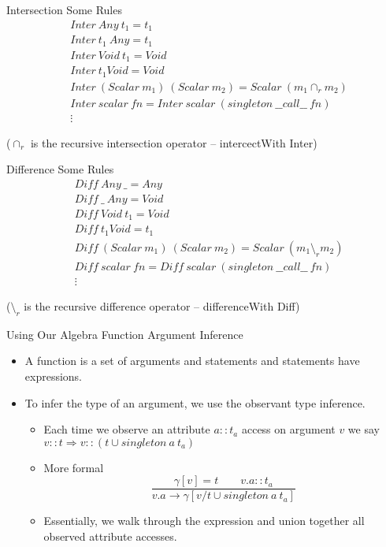 \documentclass[12pt,t]{beamer}
\newcommand{\bi}{\begin{itemize}}
\newcommand{\ei}{\end{itemize}}
\newcommand{\subt}[1]{{\footnotesize \color{subtitle} {#1}}}
\newcommand{\vitem}{\vfill\item}
\begin{document}
\begin{frame}{Intersection}
    \subt{Some Rules}
    \[
      \begin{array}{ll}
          & Inter\ Any\ t_1 = t_1 \\
          & Inter\ t_1\ Any = t_1 \\
          & Inter\ Void\ t_1 = Void \\
          & Inter\ t_1 Void = Void \\
          & Inter\ (Scalar\ m_1)\ (Scalar\ m_2) = Scalar\ (m_1\cap_r m_2) \\
          & Inter\ scalar\ fn = Inter\ scalar\ (singleton\ \_\_call\_\_\ fn) \\
          & \vdots
    \end{array}
    \]

    \vfill
    \centering\tiny{($\cap_r$ is the recursive intersection operator -- intercectWith Inter)}
\end{frame}

\begin{frame}{Difference}
    \subt{Some Rules}
    \[
      \begin{array}{ll}
          & Diff\ Any\ \_ = Any \\
          & Diff\ \_\ Any = Void \\
          & Diff\ Void\ t_1 = Void \\
          & Diff\ t_1 Void = t_1 \\
          & Diff\ (Scalar\ m_1)\ (Scalar\ m_2) = Scalar\ (m_1\setminus_r m_2) \\
          & Diff\ scalar\ fn = Diff\ scalar\ (singleton\ \_\_call\_\_\ fn) \\
          & \vdots
    \end{array}
    \]

    \vfill
    \centering\tiny{($\setminus_r$ is the recursive difference operator -- differenceWith Diff)}
\end{frame}

\begin{frame}{Using Our Algebra}
    \subt{Function Argument Inference}

    \bi
        \vitem A function is a set of arguments and statements and statements
        have expressions.

        \vitem To infer the type of an argument, we use the observant type inference.
        \bi
            \vitem Each time we observe an attribute $a :: t_a$ access on argument $v$
            we say $v :: t \Rightarrow v :: (t \cup singleton\ a\ t_a)$
            \vitem More formal
            \[
                \frac {
                    \gamma[v] = t\qquad v.a :: t_a
                } {
                    v.a \rightarrow \gamma[v/t \cup singleton\ a\ t_a]
                }
            \]
            \vitem Essentially, we walk through the expression and union together
            all observed attribute accesses.
        \ei
    \ei
\end{frame}
\end{document}
